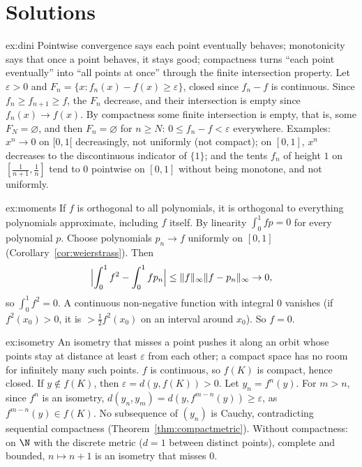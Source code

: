 \section{Solutions}

\begin{solution}{ex:dini}
\idea Pointwise convergence says each point eventually behaves; monotonicity says that once a point behaves, it stays good; compactness turns
``each point eventually'' into ``all points at once'' through the finite intersection property.
\writeup Let $\varepsilon>0$ and $F_n=\{x:f_n(x)-f(x)\ge\varepsilon\}$, closed since $f_n-f$ is continuous. Since $f_n\ge f_{n+1}\ge f$, the $F_n$ decrease, and their intersection is empty since
$f_n(x)\to f(x)$. By compactness some finite intersection is empty, that is, some $F_N=\varnothing$, and then $F_n=\varnothing$ for $n\ge N$: $0\le f_n-f<\varepsilon$ everywhere. Examples: $x^n\to0$
on $[0,1[$ decreasingly, not uniformly (not compact); on $[0,1]$, $x^n$ decreases to the discontinuous indicator of $\{1\}$; and the tents $f_n$ of height $1$ on
$[\frac1{n+1},\frac1n]$ tend to $0$ pointwise on $[0,1]$ without being monotone, and not uniformly.
\end{solution}

\begin{solution}{ex:moments}
\idea If $f$ is orthogonal to all polynomials, it is orthogonal to everything polynomials approximate, including $f$ itself.
\writeup By linearity $\int_0^1fp=0$ for every polynomial $p$. Choose polynomials $p_n\to f$ uniformly on $[0,1]$ (Corollary~\ref{cor:weierstrass}). Then
\[\Bigl|\int_0^1f^2-\int_0^1fp_n\Bigr|\le\|f\|_\infty\|f-p_n\|_\infty\to0,\]
so $\int_0^1f^2=0$. A continuous non-negative function with integral $0$ vanishes (if $f^2(x_0)>0$, it is $>\frac12f^2(x_0)$ on an interval around $x_0$). So $f=0$.
\end{solution}

\begin{solution}{ex:isometry}
\idea An isometry that misses a point pushes it along an orbit whose points stay at distance at least $\varepsilon$ from each other; a compact space
has no room for infinitely many such points.
\writeup $f$ is continuous, so $f(K)$ is compact, hence closed. If $y\notin f(K)$, then $\varepsilon=d(y,f(K))>0$. Let $y_n=f^n(y)$. For $m>n$, since $f^n$ is an isometry,
$d(y_n,y_m)=d(y,f^{m-n}(y))\ge\varepsilon$, as $f^{m-n}(y)\in f(K)$. No subsequence of $(y_n)$ is Cauchy, contradicting sequential compactness
(Theorem~\ref{thm:compactmetric}). Without compactness: on $\N$ with the discrete metric ($d=1$ between distinct points), complete and bounded,
$n\mapsto n+1$ is an isometry that misses $0$.
\end{solution}

